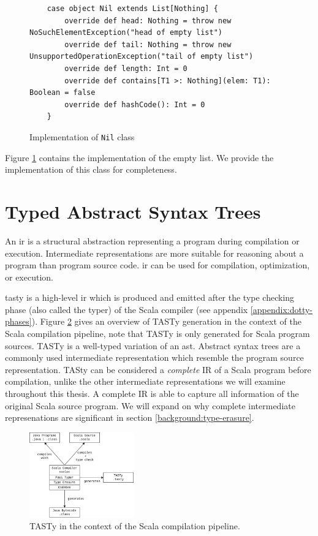 \begin{figure}[!htb]
	\begin{verbatim}
	case object Nil extends List[Nothing] {
		override def head: Nothing = throw new NoSuchElementException("head of empty list")
		override def tail: Nothing = throw new UnsupportedOperationException("tail of empty list")
		override def length: Int = 0
		override def contains[T1 >: Nothing](elem: T1): Boolean = false
		override def hashCode(): Int = 0
	}
	\end{verbatim}
	\caption{Implementation of \texttt{Nil} class}
	\label{example:nil-impl}
\end{figure}

Figure \ref{example:nil-impl} contains the implementation of the empty list. 
We provide the implementation of this class for completeness.


\section{Typed Abstract Syntax Trees}

An \acrfull{ir} is a structural abstraction representing a program during compilation or execution. 
Intermediate representations are more suitable for reasoning about a program than program source code. 
\acrshort{ir} can be used for compilation\cite{llvm}, optimization\cite{llvm}\cite{ssa}, or execution\cite{java:vm-spec}\cite{clr:spec}.

\acrfull{tasty} is a high-level \acrfull{ir} which is produced and emitted after the type checking phase (also called the typer) of the Scala compiler (see appendix \ref{appendix:dotty-phases}).
Figure \ref{system:tasty} gives an overview of TASTy generation in the context of the Scala compilation pipeline, note that TASTy is only generated for Scala program sources.
TASTy is a well-typed variation of an \acrfull{ast}.
Abstract syntax trees are a commonly used intermediate representation which resemble the program source representation.
TASty can be considered a \textit{complete} IR of a Scala program before compilation, unlike the other intermediate representations we will examine throughout this thesis.
A complete IR is able to capture all information of the original Scala source program.
We will expand on why complete intermediate represenations are significant in section \ref{background:type-erasure}.

\begin{figure}[H]
	\centering
	\includegraphics[width=0.4\textwidth]{figures/scala-pipeline.png}
	\caption{TASTy in the context of the Scala compilation pipeline.}
	\label{system:tasty}
\end{figure}

